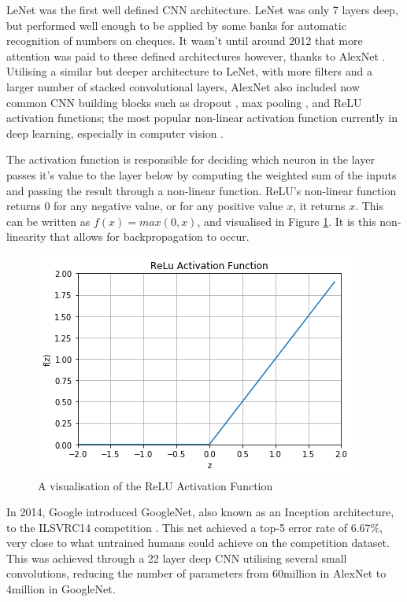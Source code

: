 LeNet \cite{lecun_gradient-based_1998} was the first well defined CNN architecture. LeNet was only 7 layers deep, but performed well enough to be applied by some banks for automatic recognition of numbers on cheques. It wasn't until around 2012 that more attention was paid to these defined architectures however, thanks to AlexNet \cite{krizhevsky_imagenet_2012}. Utilising a similar but deeper architecture to LeNet, with more filters and a larger number of stacked convolutional layers, AlexNet also included now common CNN building blocks such as dropout \cite{srivastava_dropout:_2014}, max pooling \cite{boureau_theoretical_2010}, and ReLU activation functions; the most popular non-linear activation function currently in deep learning, especially in computer vision \cite{he_delving_2015}. 

The activation function is responsible for deciding which neuron in the layer passes it's value to the layer below by computing the weighted sum of the inputs and passing the result through a non-linear function. ReLU's non-linear function returns 0 for any negative value, or for any positive value $x$, it returns $x$. This can be written as $f(x) = max(0,x)$, and visualised in Figure \ref{fig:relu}. It is this non-linearity that allows for backpropagation to occur.

\begin{figure}
	\begin{center}
		\includegraphics[scale=0.6]{Chapter2/figs/relu.png}
	\end{center}
	\caption{A visualisation of the ReLU Activation Function}
	\label{fig:relu}
\end{figure}

 In 2014, Google introduced GoogleNet, also known as an Inception architecture, to the ILSVRC14 competition \cite{szegedy_going_2015}. This net achieved a top-5 error rate of 6.67\%, very close to what untrained humans could achieve on the competition dataset. This was achieved through a 22 layer deep CNN utilising several small convolutions, reducing the number of parameters from 60million in AlexNet to 4million in GoogleNet. 

